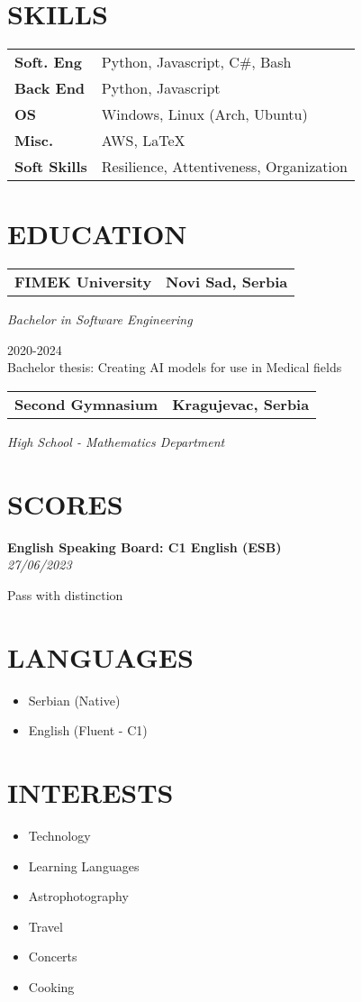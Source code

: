 \documentclass[11pt,a4paper]{moderncv}
\newcommand*{\educationentry}[4][0.5mm]{
    \begin{tabularx}{\textwidth}{LR}
        {\bfseries #3} & {\bfseries #4} \\
    \end{tabularx}
    {\itshape #2}
    \par\addvspace{#1}
}
\newcommand*{\scoreentry}[3][2.5mm]{
    {\bfseries #2} \\
    {\itshape #3}
    \par\addvspace{#1}
}
\begin{document}
\begin{minipage}[t]{0.35\textwidth}
    \section{SKILLS}
    \begin{tabularx}{\textwidth}{>{\bfseries}l@{\hskip 3.5mm}L}
        Soft. Eng   & Python, Javascript, C\#, Bash           \\
        Back End    & Python, Javascript                      \\
        OS          & Windows, Linux (Arch, Ubuntu)           \\
        Misc.       & AWS, \LaTeX                             \\
        Soft Skills & Resilience, Attentiveness, Organization
    \end{tabularx}

    \section{EDUCATION}
    \educationentry{Bachelor in Software Engineering}{FIMEK University}{Novi Sad, Serbia}
    2020-2024\\ 
    Bachelor thesis: Creating AI models for use in Medical fields
    \par
    \vspace{3.0mm}
    \educationentry{High School - Mathematics Department}{Second Gymnasium}{Kragujevac, Serbia}

    \section{SCORES}
    \scoreentry{English Speaking Board: C1 English (ESB)}{27/06/2023}
    Pass with distinction


    \section{LANGUAGES}
    \begin{itemize}
        \item Serbian (Native)
        \item English (Fluent - C1)
    \end{itemize}

    \section{INTERESTS}
    \begin{itemize}
        \item Technology
        \item Learning Languages
        \item Astrophotography
        \item Travel
        \item Concerts
        \item Cooking
    \end{itemize}
\end{minipage}
\end{document}
